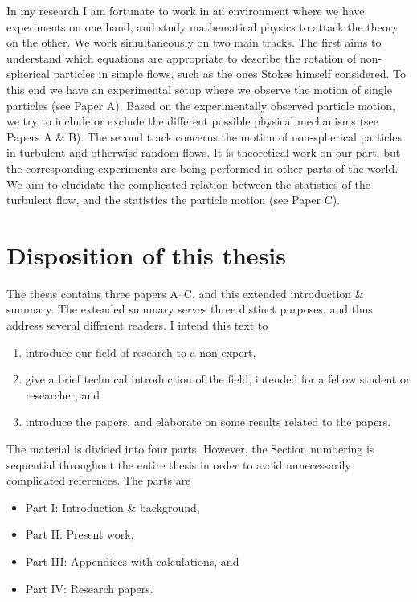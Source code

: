 \documentclass[thesis.tex]{subfiles}
\begin{document}
In my research I am fortunate to work in an environment where we have experiments on one hand, and study mathematical physics to attack the theory on the other. We work simultaneously on two main tracks. The first aims to understand which equations are appropriate to describe the rotation of non-spherical particles in simple flows, such as the ones Stokes himself considered. To this end we have an experimental setup where we observe the motion of single particles (see Paper A). Based on the experimentally observed particle motion, we try to include or exclude the different possible physical mechanisms (see Papers A \& B). The second track concerns the motion of non-spherical particles in turbulent and otherwise random flows. It is theoretical work on our part, but the corresponding experiments are being performed in other parts of the world. We aim to elucidate the complicated relation between the statistics of the turbulent flow, and the statistics the particle motion (see Paper C).


\section*{Disposition of this thesis}

The thesis contains three papers A--C, and this extended introduction \& summary. The extended summary serves three distinct purposes, and thus address several different readers. I intend this text to 
\begin{enumerate}
	\item introduce our field of research to a non-expert,
	\item give a brief technical introduction of the field, intended for a fellow student or researcher, and
	\item introduce the papers, and elaborate on some results related to the papers.
\end{enumerate}
The material is divided into four parts. However, the Section numbering is sequential throughout the entire thesis in order to avoid unnecessarily complicated references. The parts are
\begin{itemize}
	\item Part I: Introduction \& background,
	\item Part II: Present work,
	\item Part III: Appendices with calculations, and
	\item Part IV: Research papers.
\end{itemize}
\end{document}
